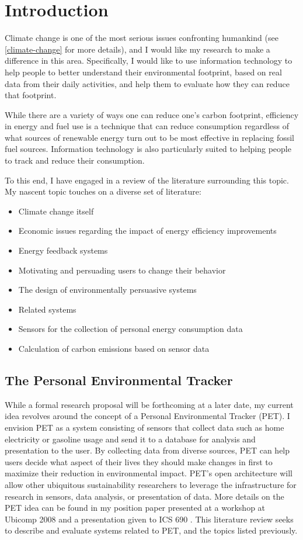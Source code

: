 \chapter{Introduction}
Climate change is one of the most serious issues confronting humankind (see \autoref{climate-change} for more details), and I would like my research to make a difference in this area. Specifically, I would like to use information technology to help people to better understand their environmental footprint, based on real data from their daily activities, and help them to evaluate how they can reduce that footprint.

While there are a variety of ways one can reduce one's carbon footprint, efficiency in energy and fuel use is a technique that can reduce consumption regardless of what sources of renewable energy turn out to be most effective in replacing fossil fuel sources. Information technology is also particularly suited to helping people to track and reduce their consumption.

To this end, I have engaged in a review of the literature surrounding this topic. My nascent topic touches on a diverse set of literature:
\begin{itemize}
	\item Climate change itself
	\item Economic issues regarding the impact of energy efficiency improvements
	\item Energy feedback systems
	\item Motivating and persuading users to change their behavior
	\item The design of environmentally persuasive systems
	\item Related systems
	\item Sensors for the collection of personal energy consumption data
	\item Calculation of carbon emissions based on sensor data
\end{itemize}

\section{The Personal Environmental Tracker}
\label{PET-description}
While a formal research proposal will be forthcoming at a later date, my current idea revolves around the concept of a Personal Environmental Tracker (PET). I envision PET as a system consisting of sensors that collect data such as home electricity or gasoline usage and send it to a database for analysis and presentation to the user. By collecting data from diverse sources, PET can help users decide what aspect of their lives they should make changes in first to maximize their reduction in environmental impact. PET's open architecture will allow other ubiquitous sustainability researchers to leverage the infrastructure for research in sensors, data analysis, or presentation of data. More details on the PET idea can be found in my position paper presented at a workshop at Ubicomp 2008 \cite{csdl2-08-01} and a presentation given to ICS 690 \cite{Brewer2008-PET-presentation}. This literature review seeks to describe and evaluate systems related to PET, and the topics listed previously.